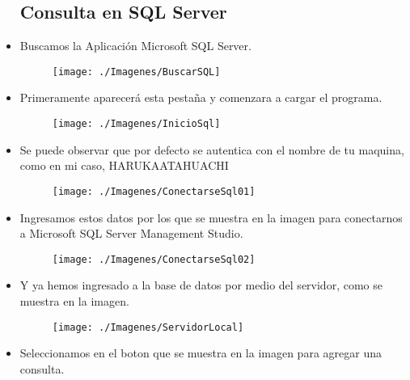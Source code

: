 \begin{itemize}
			\subsection{Consulta en SQL Server}
				\item Buscamos la Aplicación Microsoft SQL Server.
					\begin{figure}[htb]
						\begin{center}
							\texttt{[image: ./Imagenes/BuscarSQL]}
						\end{center}
					\end{figure}
				\item Primeramente aparecerá esta pestaña y comenzara a cargar el programa.
					\begin{figure}[htb]
						\begin{center}
							\texttt{[image: ./Imagenes/InicioSql]}
						\end{center}
					\end{figure}
				\item Se puede observar que por defecto se autentica con el nombre de tu maquina, como en mi caso, HARUKAATAHUACHI
					\begin{figure}[htb]
						\begin{center}
							\texttt{[image: ./Imagenes/ConectarseSql01]}
						\end{center}
					\end{figure}
					\vspace{7cm}
				\item Ingresamos estos datos por los que se muestra en la imagen para conectarnos a Microsoft SQL Server Management Studio.
					\begin{figure}[htb]
						\begin{center}
							\texttt{[image: ./Imagenes/ConectarseSql02]}
						\end{center}
					\end{figure}
				\item Y ya hemos ingresado a la base de datos por medio del servidor, como se muestra en la imagen.
					\begin{figure}[htb]
						\begin{center}
							\texttt{[image: ./Imagenes/ServidorLocal]}
						\end{center}
					\end{figure}
					\vspace{5cm}
				\item Seleccionamos en el boton que se muestra en la imagen para agregar una consulta.

\end{itemize}
